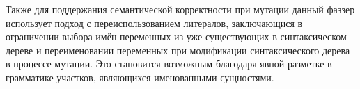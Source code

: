 Также для поддержания семантической корректности при мутации данный фаззер использует подход с переиспользованием литералов, заключающися в ограничении выбора имён переменных из уже существующих в синтаксическом дереве и переименовании переменных при модификации синтаксического дерева в процессе мутации. Это становится возможным благодаря явной разметке в грамматике участков, являющихся именованными сущностями.
